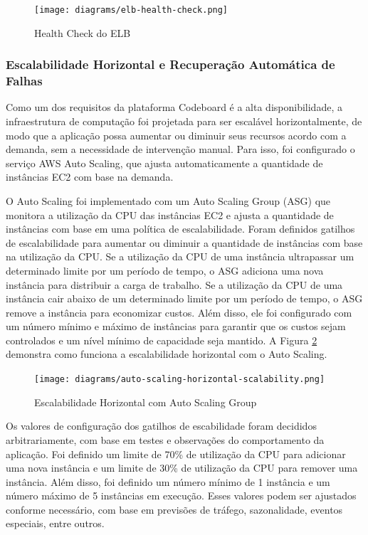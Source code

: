 \begin{figure}[H]
    \centering
    \texttt{[image: diagrams/elb-health-check.png]}
    \caption{Health Check do ELB}
    \label{fig:elb-health-check}
\end{figure}


\subsubsection{Escalabilidade Horizontal e Recuperação Automática de Falhas}

Como um dos requisitos da plataforma Codeboard é a alta disponibilidade, a infraestrutura de computação foi projetada para ser escalável horizontalmente, de modo que a aplicação possa aumentar ou diminuir seus recursos acordo com a demanda, sem a necessidade de intervenção manual. Para isso, foi configurado o serviço AWS Auto Scaling, que ajusta automaticamente a quantidade de instâncias EC2 com base na demanda.

O Auto Scaling foi implementado com um Auto Scaling Group (ASG) que monitora a utilização da CPU das instâncias EC2 e ajusta a quantidade de instâncias com base em uma política de escalabilidade. Foram definidos gatilhos de escalabilidade para aumentar ou diminuir a quantidade de instâncias com base na utilização da CPU. Se a utilização da CPU de uma instância ultrapassar um determinado limite por um período de tempo, o ASG adiciona uma nova instância para distribuir a carga de trabalho. Se a utilização da CPU de uma instância cair abaixo de um determinado limite por um período de tempo, o ASG remove a instância para economizar custos. Além disso, ele foi configurado com um número mínimo e máximo de instâncias para garantir que os custos sejam controlados e um nível mínimo de capacidade seja mantido. A Figura \ref{fig:auto-scaling-horizontal-scalability} demonstra como funciona a escalabilidade horizontal com o Auto Scaling.

\begin{figure}[H]
    \centering
    \texttt{[image: diagrams/auto-scaling-horizontal-scalability.png]}
    \caption{Escalabilidade Horizontal com Auto Scaling Group}
    \label{fig:auto-scaling-horizontal-scalability}
\end{figure}

Os valores de configuração dos gatilhos de escabilidade foram decididos arbitrariamente, com base em testes e observações do comportamento da aplicação. Foi definido um limite de 70\% de utilização da CPU para adicionar uma nova instância e um limite de 30\% de utilização da CPU para remover uma instância. Além disso, foi definido um número mínimo de 1 instância e um número máximo de 5 instâncias em execução. Esses valores podem ser ajustados conforme necessário, com base em previsões de tráfego, sazonalidade, eventos especiais, entre outros.

